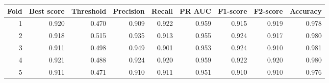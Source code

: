 \begin{tabular}{rrrrrrrrr}
\toprule
Fold & Best score & Threshold & Precision & Recall & PR AUC & F1-score & F2-score & Accuracy \\
\midrule
1 & 0.920 & 0.470 & 0.909 & 0.922 & 0.959 & 0.915 & 0.919 & 0.978 \\
2 & 0.918 & 0.515 & 0.935 & 0.913 & 0.955 & 0.924 & 0.917 & 0.980 \\
3 & 0.911 & 0.498 & 0.949 & 0.901 & 0.953 & 0.924 & 0.910 & 0.981 \\
4 & 0.921 & 0.488 & 0.924 & 0.920 & 0.959 & 0.922 & 0.920 & 0.980 \\
5 & 0.911 & 0.471 & 0.910 & 0.911 & 0.951 & 0.910 & 0.910 & 0.976 \\
\bottomrule
\end{tabular}

